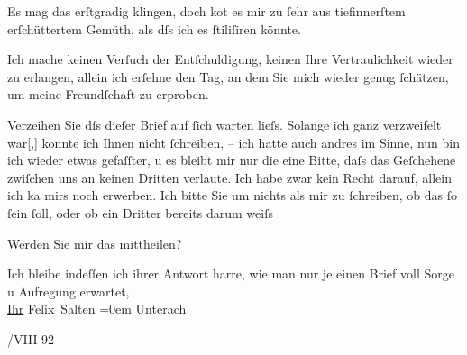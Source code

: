 \pstart
           Es mag das erſtgradig klingen, doch ko{\geminationm}t es mir zu{ }ſehr
               aus tiefinnerſtem erſchüttertem Gemüth, als dſs ich es{ }ſtiliſiren könnte.\pend
           
\pstart
           Ich mache keinen Verſuch der Entſchuldigung, keinen Ihre Vertraulichkeit wieder zu
                  er{\pb}langen, allein ich
               erſehne den Tag, an dem Sie mich wieder genug{ }ſchätzen, um meine Freundſchaft zu
               erproben.\pend
           
\pstart
           Verzeihen Sie dſs dieſer Brief auf{ }ſich warten lieſs. Solange ich ganz verzweifelt
                  war{[},{]} konnte ich Ihnen nicht{ }ſchreiben, – ich hatte auch
               andres im Sinne, nun bin ich wieder etwas gefaſſter, u es bleibt mir nur die eine
               Bitte, daſs das Geſchehene zwiſchen uns an keinen Dritten verlaute. Ich habe zwar
               kein Recht darauf, allein ich ka{\geminationn} mirs noch erwerben.
               Ich bitte Sie um nichts als mir zu{ }ſchreiben, ob das{ }ſo{ }ſein{ }ſoll, oder ob ein {\pb}Dritter bereits darum
               weiſs\pend
           
\pstart
           Werden Sie mir das mittheilen?\pend
           
\pstart
           Ich bleibe indeſſen ich ihrer Antwort harre, wie man nur je einen Brief voll
               Sorge u Aufregung erwartet, {\\[\baselineskip]}\uline{Ihr}{ }\spacefill\mbox{Felix Salten}\pend
           \leftskip=0em{}
\pstart
           \noindent{}Unterach\pend
           
/VIII 92\pend
           \endnumbering{}  \newcommand{\dateiname}{L03112}\newcommand{\titel}{Felix Salten an Arthur Schnitzler, 17. 8. 1892}\newcommand{\editorInnen}{Martin Anton Müller und Laura Untner}
